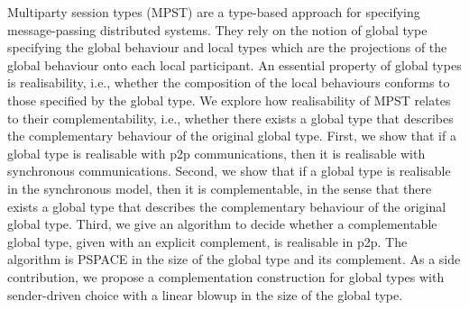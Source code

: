 





Multiparty session types (MPST) are a type-based approach for specifying message-passing distributed systems.
They rely on the notion of global type specifying the global behaviour and local types which are the projections of the global behaviour onto each local participant. An essential property of global types is realisability, i.e., whether the composition of the local behaviours conforms to those specified by the global type.
We explore how realisability of MPST relates to their complementability, i.e., whether there exists a global type that describes the complementary behaviour of the original global type.
First, we show that if a global type is realisable with p2p communications, then it is realisable with synchronous communications. Second, we show that if a global type is realisable in the synchronous model, then it is complementable, in the sense that there exists a global type that describes the complementary behaviour of the original global type.
Third, we give an algorithm to decide whether a complementable global type, given with an explicit complement, is 
realisable in p2p. The algorithm is PSPACE in the size of the global type and its complement. As a side contribution, we propose a complementation construction for global types with sender-driven choice with a linear blowup in the size of the global type.